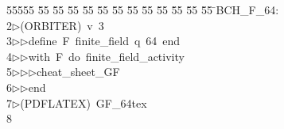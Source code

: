 %
%
\begin{tabbing}
55555 \= 55 \= 55 \= 55 \= 55 \= 55 \= 55 \= 55 \= 55 \= 55 \= 55 \= 55 \= 55 \= \>BCH\_F\_64:\\[0pt]
2\>$\triangleright$\>(ORBITER)\ v\ 3\ \\[0pt]
3\>$\triangleright$\>$\triangleright$\>define\ F\ finite\_field\ q\ 64\ end\ \\[0pt]
4\>$\triangleright$\>$\triangleright$\>with\ F\ do\ finite\_field\_activity\ \\[0pt]
5\>$\triangleright$\>$\triangleright$\>$\triangleright$\>cheat\_sheet\_GF\ \\[0pt]
6\>$\triangleright$\>$\triangleright$\>end\\[0pt]
7\>$\triangleright$\>(PDFLATEX)\ GF\_64tex\\[0pt]
8\>\end{tabbing}
